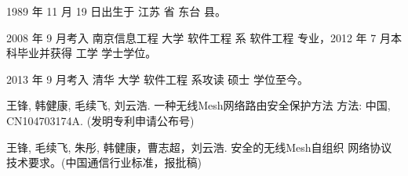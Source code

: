 \begin{resume}


  1989 年 11 月 19 日出生于 江苏 省 东台 县。

  2008 年 9 月考入 南京信息工程 大学 软件工程 系 软件工程 专业，2012 年 7 月本科毕业并获得 工学 学士学位。

  2013 年 9 月考入 清华 大学 软件工程 系攻读 硕士 学位至今。

  \begin{achievements}
    \item 王锋, 韩健康, 毛续飞, 刘云浩. 一种无线Mesh网络路由安全保护方法
      方法: 中国, CN104703174A. (发明专利申请公布号)
    \item 王锋, 毛续飞, 朱彤, 韩健康，曹志超，刘云浩. 安全的无线Mesh自组织
        网络协议技术要求。(中国通信行业标准，报批稿)
  \end{achievements}

\end{resume}

